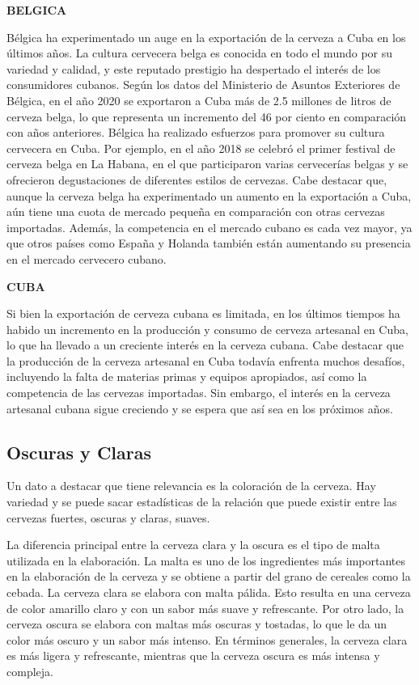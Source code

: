\documentclass[a4paper,12pt]{article}
\begin{document}
\begin{center}
    \textbf{BELGICA}
\end{center}
Bélgica ha experimentado un auge en la exportación de la cerveza a Cuba en los últimos años. 
La cultura cervecera belga es conocida en todo el mundo por su variedad y calidad, y este reputado prestigio ha despertado el interés de los consumidores cubanos. 
Según los datos del Ministerio de Asuntos Exteriores de Bélgica, en el año 2020 se exportaron a Cuba más de 2.5 millones de litros de cerveza belga, lo que representa un incremento del 46 por ciento en comparación con años anteriores. 
Bélgica ha realizado esfuerzos para promover su cultura cervecera en Cuba. 
Por ejemplo, en el año 2018 se celebró el primer festival de cerveza belga en La Habana, en el que participaron varias cervecerías belgas y se ofrecieron degustaciones de diferentes estilos de cervezas. 
Cabe destacar que, aunque la cerveza belga ha experimentado un aumento en la exportación a Cuba, aún tiene una cuota de mercado pequeña en comparación con otras cervezas importadas. 
Además, la competencia en el mercado cubano es cada vez mayor, ya que otros países como España y Holanda también están aumentando su presencia en el mercado cervecero cubano.

\begin{center}
    \textbf{CUBA}
\end{center}
Si bien la exportación de cerveza cubana es limitada, en los últimos tiempos ha habido un incremento en la producción y consumo de cerveza artesanal en Cuba, lo que ha llevado a un creciente interés en la cerveza cubana. 
Cabe destacar que la producción de la cerveza artesanal en Cuba todavía enfrenta muchos desafíos, incluyendo la falta de materias primas y equipos apropiados, así como la competencia de las cervezas importadas. 
Sin embargo, el interés en la cerveza artesanal cubana sigue creciendo y se espera que así sea en los próximos años.

\subsection{Oscuras y Claras}
Un dato a destacar que tiene relevancia es la coloración de la cerveza. 
Hay variedad y se puede sacar estadísticas de la relación que puede existir entre las cervezas fuertes, oscuras y claras, suaves.

La diferencia principal entre la cerveza clara y la oscura es el tipo de malta utilizada en la elaboración. 
La malta es uno de los ingredientes más importantes en la elaboración de la cerveza y se obtiene a partir del grano de cereales como la cebada. 
La cerveza clara se elabora con malta pálida. Esto resulta en una cerveza de color amarillo claro y con un sabor más suave y refrescante. 
Por otro lado, la cerveza oscura se elabora con maltas más oscuras y tostadas, lo que le da un color más oscuro y un sabor más intenso. 
En términos generales, la cerveza clara es más ligera y refrescante, mientras que la cerveza oscura es más intensa y compleja.
\end{document}
